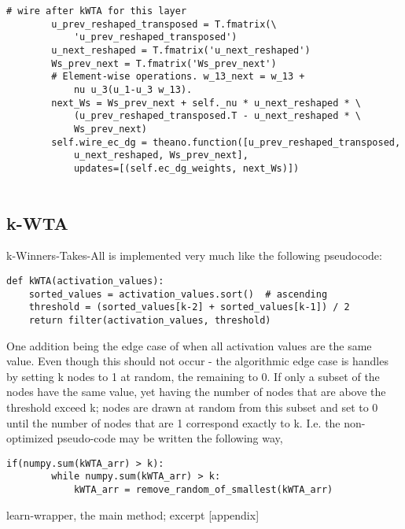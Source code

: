 \begin{Verbatim}[fontsize=\small]
        # wire after kWTA for this layer
        u_prev_reshaped_transposed = T.fmatrix(\
            'u_prev_reshaped_transposed')
        u_next_reshaped = T.fmatrix('u_next_reshaped')
        Ws_prev_next = T.fmatrix('Ws_prev_next')
        # Element-wise operations. w_13_next = w_13 + 
            nu u_3(u_1-u_3 w_13).
        next_Ws = Ws_prev_next + self._nu * u_next_reshaped * \
            (u_prev_reshaped_transposed.T - u_next_reshaped * \
            Ws_prev_next)
        self.wire_ec_dg = theano.function([u_prev_reshaped_transposed,
            u_next_reshaped, Ws_prev_next], 
            updates=[(self.ec_dg_weights, next_Ws)])
                                          
\end{Verbatim}

\subsection*{k-WTA}

k-Winners-Takes-All is implemented very much like the following pseudocode:

\begin{Verbatim}[fontsize=\small]
def kWTA(activation_values):
    sorted_values = activation_values.sort()  # ascending
    threshold = (sorted_values[k-2] + sorted_values[k-1]) / 2
    return filter(activation_values, threshold)

\end{Verbatim}

One addition being the edge case of when all activation values are the same value. Even though this should not occur - the algorithmic edge case is handles by setting k nodes to 1 at random, the remaining to 0. If only a subset of the nodes have the same value, yet having the number of nodes that are above the threshold exceed k; nodes are drawn at random from this subset and set to 0 until the number of nodes that are 1 correspond exactly to k. I.e. the non-optimized pseudo-code may be written the following way,

\begin{Verbatim}[fontsize=\small]
    if(numpy.sum(kWTA_arr) > k):
        while numpy.sum(kWTA_arr) > k:
            kWTA_arr = remove_random_of_smallest(kWTA_arr)

\end{Verbatim}

learn-wrapper, the main method; excerpt [appendix]


\cleardoublepage